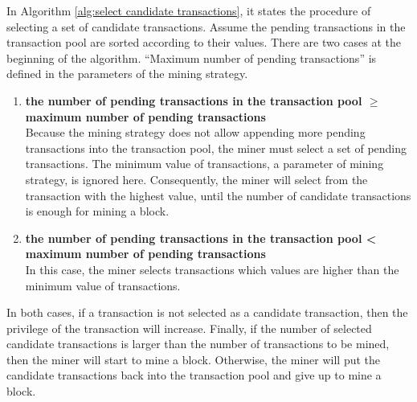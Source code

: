 In Algorithm \ref{alg:select candidate transactions}, it states the procedure of selecting a set of candidate transactions. Assume the pending transactions in the transaction pool are sorted according to their values. There are two cases at the beginning of the algorithm. ``Maximum number of pending transactions'' is defined in the parameters of the mining strategy.

\begin{enumerate}
    \item \textbf{the number of pending transactions in the transaction pool $\geq$ maximum number of pending transactions} \\
        Because the mining strategy does not allow appending more pending transactions into the transaction pool, the miner must select a set of pending transactions. The minimum value of transactions, a parameter of mining strategy, is ignored here. Consequently, the miner will select from the transaction with the highest value, until the number of candidate transactions is enough for mining a block.
    \item \textbf{the number of pending transactions in the transaction pool < maximum number of pending transactions} \\
        In this case, the miner selects transactions which values are higher than the minimum value of transactions.
\end{enumerate}

In both cases, if a transaction is not selected as a candidate transaction, then the privilege of the transaction will increase. Finally, if the number of selected candidate transactions is larger than the number of transactions to be mined, then the miner will start to mine a block. Otherwise, the miner will put the candidate transactions back into the transaction pool and give up to mine a block.

